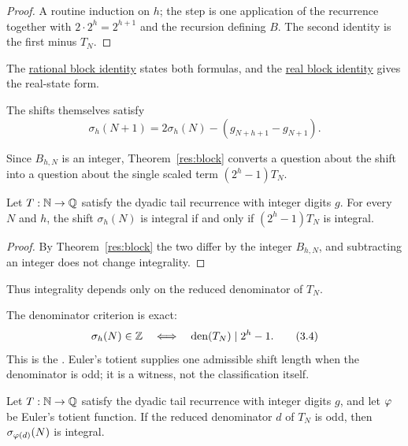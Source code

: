 \documentclass[11pt]{article}
\begin{document}
\begin{proof}
A routine induction on $h$; the step is one application of the recurrence together with
$2\cdot2^{h}=2^{h+1}$ and the recursion defining $B$.  The second identity is
the first minus $T_N$.
\end{proof}

\noindent The \href{https://github.com/wcook04/plectis-erdos/blob/f36a98bf3d3e6f65f1074e3b800e3293d5b8a51a/ErdosProblems/Erdos251/PaperCoreR7.lean#L68}{rational block identity}
states both formulas, and the \href{https://github.com/wcook04/plectis-erdos/blob/f36a98bf3d3e6f65f1074e3b800e3293d5b8a51a/ErdosProblems/Erdos251/PaperCoreR7.lean#L76}{real block identity}
gives the real-state form.

The shifts themselves satisfy
\[
 \sigma_h(N+1)=2\sigma_h(N)-(g_{N+h+1}-g_{N+1}).
\]

Since $B_{h,N}$ is an integer, Theorem~\ref{res:block} converts a question about
the shift into a question about the single scaled term $(2^{h}-1)T_N$.

\begin{theorem}\label{res:shiftiff}
Let $T:\mathbb{N}\to\mathbb{Q}$ satisfy the dyadic tail recurrence with integer digits $g$.
For every $N$ and $h$, the shift $\sigma_h(N)$ is integral if and only if
$(2^{h}-1)T_N$ is integral.
\end{theorem}

\begin{proof}
By Theorem~\ref{res:block} the two differ by the integer $B_{h,N}$, and
subtracting an integer does not change integrality.
\end{proof}

Thus integrality depends only on the reduced denominator of $T_N$.

The denominator criterion is exact:
\[
  \sigma_h(N)\in\Z
  \quad\Longleftrightarrow\quad
  \operatorname{den}(T_N)\mid 2^h-1.
\tag{3.4}\label{eq:shift-denominator}
\]
This is the
.  Euler's totient supplies one admissible shift length when
the denominator is odd; it is a witness, not the classification itself.

\begin{theorem}\label{res:totient}
Let $T:\mathbb{N}\to\mathbb{Q}$ satisfy the dyadic tail recurrence with integer digits $g$, and
let $\varphi$ be Euler's totient function.  If the reduced denominator $d$ of
$T_N$ is odd, then $\sigma_{\varphi(d)}(N)$ is integral.
\end{theorem}
\end{document}
